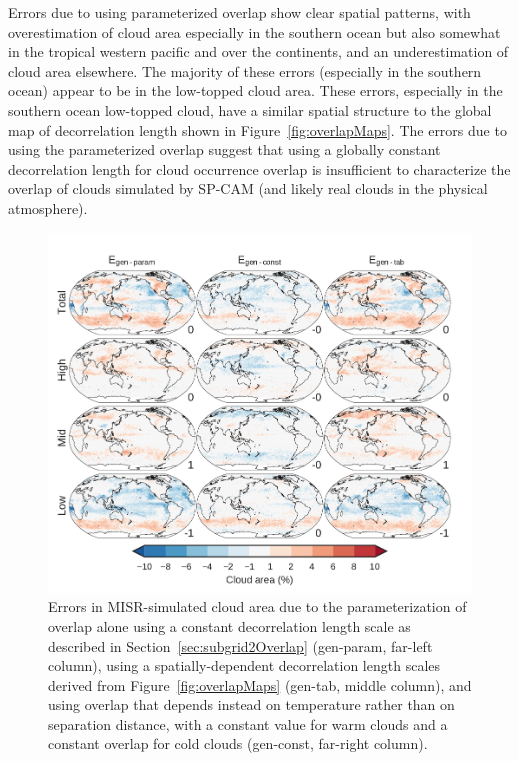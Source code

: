 Errors due to using parameterized overlap show clear spatial patterns,
with overestimation of cloud area especially in the southern ocean but
also somewhat in the tropical western pacific and over the continents,
and an underestimation of cloud area elsewhere. The majority of these
errors (especially in the southern ocean) appear to be in the low-topped
cloud area. These errors, especially in the southern ocean low-topped
cloud, have a similar spatial structure to the global map of
decorrelation length shown in Figure~\ref{fig:overlapMaps}. The errors
due to using the parameterized overlap suggest that using a globally
constant decorrelation length for cloud occurrence overlap is
insufficient to characterize the overlap of clouds simulated by SP-CAM
(and likely real clouds in the physical atmosphere).

\begin{figure}[htbp]
\centering
\includegraphics{graphics/subgrid2_cldmisr_maps_overlap_diff.pdf}
\caption{\label{fig:cldmisrMapsOverlapDiff}Errors in MISR-simulated
cloud area due to the parameterization of overlap alone using a constant
decorrelation length scale as described in
Section~\ref{sec:subgrid2Overlap} (gen-param, far-left column), using a
spatially-dependent decorrelation length scales derived from
Figure~\ref{fig:overlapMaps} (gen-tab, middle column), and using overlap
that depends instead on temperature rather than on separation distance,
with a constant value for warm clouds and a constant overlap for cold
clouds (gen-const, far-right column).}\label{fig:cldmisrMapsOverlapDiff}
\end{figure}

